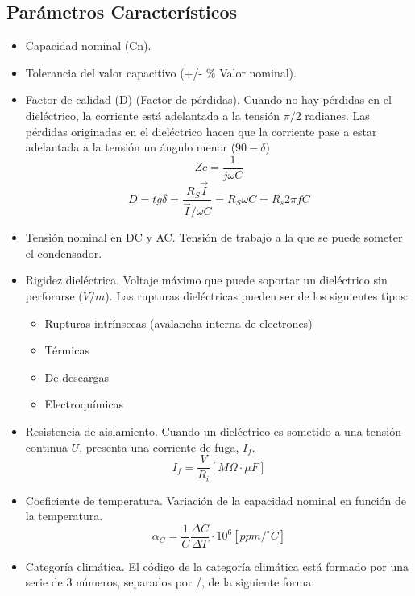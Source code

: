 \subsection{Parámetros Característicos}
\begin{itemize}
    \item Capacidad nominal (Cn).
    \item Tolerancia del valor capacitivo (+/- \% Valor nominal).
    \item Factor de calidad (D) (Factor de pérdidas). Cuando no hay pérdidas en el dieléctrico, la corriente está adelantada a la tensión $\pi / 2$ radianes. Las pérdidas originadas en el dieléctrico hacen que la corriente pase a estar adelantada a la tensión un ángulo menor ($90-\delta$)
    \begin{equation}
        Zc = \frac{1}{j\omega C}
    \end{equation}
    \begin{equation}
        D = tg \delta = \frac{R_S \vec{I}}{\vec{I}/\omega C} = R_S \omega C = R_s 2 \pi f C
    \end{equation}
    \item Tensión nominal en DC y AC. Tensión de trabajo a la que se puede someter el condensador.
    \item Rigidez dieléctrica. Voltaje máximo que puede soportar un dieléctrico sin perforarse ($V/m$). Las rupturas dieléctricas pueden ser de los siguientes tipos:
    \begin{itemize}
        \item Rupturas intrínsecas (avalancha interna de electrones)
        \item Térmicas
        \item De descargas
        \item Electroquímicas
    \end{itemize}
    \item Resistencia de aislamiento. Cuando un dieléctrico es sometido a una tensión continua $U$, presenta una corriente de fuga, $I_f$.
    \begin{equation}
        I_f = \frac{V}{R_i} [M\Omega \cdot \mu F]
    \end{equation}
    \item Coeficiente de temperatura. Variación de la capacidad nominal en función de la temperatura.
    \begin{equation}
        \alpha_C = \frac{1}{C} \frac{\Delta C}{\Delta T} \cdot 10^6 [ppm / ^\circ C]
    \end{equation}
    \item Categoría climática. El código de la categoría climática está formado por una serie de 3 números, separados por /, de la siguiente forma:

\end{itemize}
